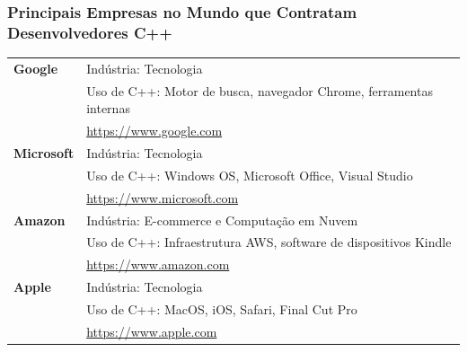 \documentclass[aspectratio=169]{beamer}
\begin{document}
\begin{frame}
    \frametitle{Principais Empresas no Mundo que Contratam Desenvolvedores C++}

    \small
    \begin{tabular}{p{} p{}}
        \textbf{Google} & 
        Indústria: Tecnologia \\
        & Uso de C++: Motor de busca, navegador Chrome, ferramentas internas \\
        & \href{https://www.google.com}{https://www.google.com}  \\ \hline
        
        \textbf{Microsoft} & 
        Indústria: Tecnologia \\
        & Uso de C++: Windows OS, Microsoft Office, Visual Studio \\
        & \href{https://www.microsoft.com}{https://www.microsoft.com} \\ \hline
        
        \textbf{Amazon} & 
        Indústria: E-commerce e Computação em Nuvem \\
        & Uso de C++: Infraestrutura AWS, software de dispositivos Kindle \\
        & \href{https://www.amazon.com}{https://www.amazon.com} \\ \hline
        
        \textbf{Apple} & 
        Indústria: Tecnologia \\
        & Uso de C++: MacOS, iOS, Safari, Final Cut Pro \\
        & \href{https://www.apple.com}{https://www.apple.com} \\
    \end{tabular}
\end{frame}
\end{document}
